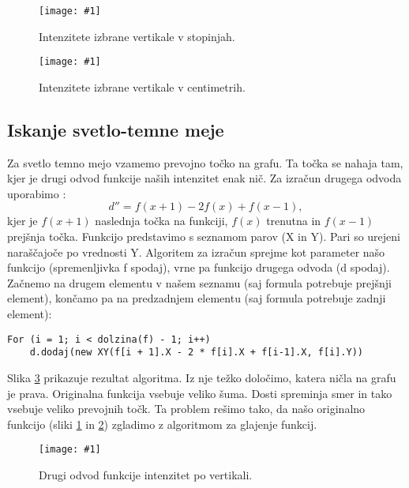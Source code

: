 \documentclass[oneside, a4paper, 12pt]{book}
\newcommand{\slika}[3]{
	\begin{figure}
	\begin{center}
	\texttt{[image: \#1]}
	\end{center}
	\vspace{-20pt}
	\caption{#2}
	\label{#3}
	\end{figure}
}
\begin{document}
\slika{slike/intenzitete.jpg}{Intenzitete izbrane vertikale v stopinjah.}{pic:intenzitete1}

\slika{slike/intenzitete-v-cm.jpg}{Intenzitete izbrane vertikale v centimetrih.}{pic:intenzitete2}

\subsection{Iskanje svetlo-temne meje}
\begin{samepage}
Za svetlo temno mejo vzamemo prevojno točko na grafu. Ta točka se nahaja tam, kjer je drugi odvod funkcije naših intenzitet enak nič. Za izračun drugega odvoda uporabimo \cite{second-d}:
\begin{equation}
d''=f(x+1) - 2f(x) + f(x-1),
\end{equation}
kjer je $f(x+1)$ naslednja točka na funkciji, $f(x)$ trenutna in $f(x-1)$ prejšnja točka. Funkcijo predstavimo s seznamom parov (X in Y). Pari so urejeni naraščajoče po vrednosti Y. Algoritem za izračun sprejme kot parameter našo funkcijo (spremenljivka f spodaj), vrne pa funkcijo drugega odvoda (d spodaj). Začnemo na drugem elementu v našem seznamu (saj formula potrebuje prejšnji element), končamo pa na predzadnjem elementu (saj formula potrebuje zadnji element):

\begin{verbatim}
For (i = 1; i < dolzina(f) - 1; i++) 
    d.dodaj(new XY(f[i + 1].X - 2 * f[i].X + f[i-1].X, f[i].Y))
\end{verbatim}
\end{samepage}

Slika \ref{pic:d2} prikazuje rezultat algoritma. Iz nje težko določimo, katera ničla na grafu je prava. Originalna funkcija vsebuje veliko šuma. Dosti spreminja smer in tako vsebuje veliko prevojnih točk. Ta problem rešimo tako, da našo originalno funkcijo (sliki \ref{pic:intenzitete1} in \ref{pic:intenzitete2}) zgladimo z algoritmom za glajenje funkcij.

\slika{slike/drugi-odvod-1.jpg}{Drugi odvod funkcije intenzitet po vertikali.}{pic:d2}
\end{document}
